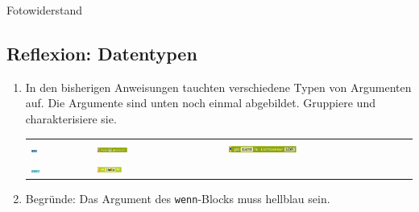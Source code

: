 \begin{zsfg}{Fotowiderstand}
\begin{minipage}{0.28\textwidth}
\begin{minipage}{0.48\textwidth}
		\end{minipage}
	\end{minipage}
\end{zsfg}

\subsection{Reflexion: Datentypen}
\label{sec:datentypen}

\begin{aufgabe}
	\begin{enumerate}[label=\alph*), itemsep=0ex, parsep=0ex]
		\item In den bisherigen Anweisungen tauchten verschiedene Typen von Argumenten auf. Die Argumente sind unten noch einmal abgebildet. Gruppiere und charakterisiere sie.
		
		\bigskip
		\begin{tabu} to \textwidth {X[L]X[L,2]X[L,3]}
			\includegraphics[width=0.1\textwidth]{./pics/zahlargument1.png} & 
			\includegraphics[width=0.25\textwidth]{./pics/wahrheitswertargument1.png} & 
			\includegraphics[width=0.38\textwidth]{./pics/zahlargument2.png} \\
			\includegraphics[width=0.15\textwidth]{./pics/wahrheitswertargument2.png} & 
			\includegraphics[width=0.2\textwidth]{./pics/textargument.png} & \\
		\end{tabu}
		\bigskip
		\item Begründe: Das Argument des \texttt{wenn}-Blocks muss hellblau sein. 
	\end{enumerate}
\end{aufgabe}

